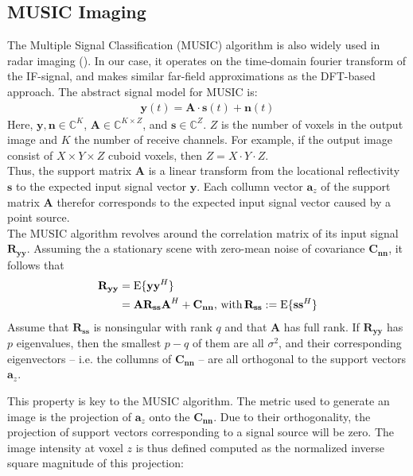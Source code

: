 \subsection{MUSIC Imaging}
The Multiple Signal Classification (MUSIC) algorithm \cite{music} is also widely used in radar imaging ().
In our case, it operates on the time-domain fourier transform of the IF-signal,
and makes similar far-field approximations as the DFT-based approach.
The abstract signal model for MUSIC is:
\begin{align}
    \mathbf y(t) = \mathbf A \cdot \mathbf s(t) + \mathbf n(t)
\end{align}
Here, $\mathbf y,\mathbf n \in \mathbb{C}^{K}$,
$\mathbf A \in \mathbb{C}^{K \times Z}$, and
$\mathbf s \in \mathbb{C}^{Z}$.
$Z$ is the number of voxels in the output image and $K$ the number of receive channels.
For example, if the output image consist of $X \times Y \times Z$ cuboid voxels, then $Z=X\cdot Y\cdot Z$. \\
Thus, the support matrix $\mathbf A$ is a linear transform from the locational reflectivity $\mathbf{s}$
to the expected input signal vector $\mathbf{y}$.
Each collumn vector $\mathbf a_z$ of the support matrix $\mathbf A$ therefor corresponds to the expected input signal vector caused by a point source. \\

The MUSIC algorithm revolves around the correlation matrix of its input signal $\mathbf{R_{yy}}$.
Assuming the a stationary scene with zero-mean noise of covariance $\mathbf{C_{nn}}$,
it follows that
\begin{align}
    \mathbf{R_{yy}} & = \text{E}\{\mathbf{yy}^H\}             \\
                    & =\mathbf{AR_{ss}A}^H + \mathbf{C_{nn}},
    \text{\,with\,} \mathbf{R_{ss}} := \text{E}\{\mathbf{ss}^H\}
\end{align}
Assume that $\mathbf{R_{ss}}$ is nonsingular with rank $q$ and that $\mathbf{A}$ has full rank.
If $\mathbf{R_{yy}}$ has $p$ eigenvalues, then the smallest $p-q$ of them are all $\sigma^2$,
and their corresponding eigenvectors -- i.e. the collumns of $\mathbf{C_{nn}}$ -- are all orthogonal to the support vectors $\mathbf a_z$.

This property is key to the MUSIC algorithm.
The metric used to generate an image is the projection of $\mathbf a_z$ onto the $\mathbf{C_{nn}}$.
Due to their orthogonality, the projection of support vectors corresponding to a signal source will be zero.
The image intensity at voxel $z$ is thus defined computed as the normalized inverse square magnitude of this projection:

